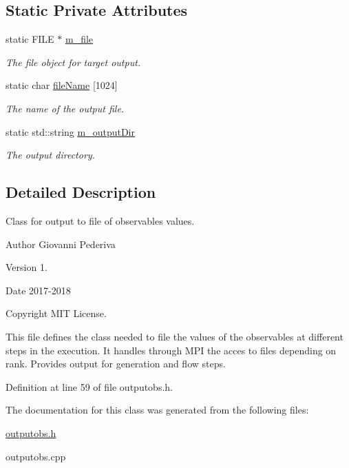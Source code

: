 \subsection*{Static Private Attributes}
\begin{DoxyCompactItemize}
\item 
static F\+I\+LE $\ast$ \hyperlink{classLatticeIO_1_1OutputObs_ad725efe02bfef0f70ef2a43722ce041d}{m\+\_\+file}\hypertarget{classLatticeIO_1_1OutputObs_ad725efe02bfef0f70ef2a43722ce041d}{}\label{classLatticeIO_1_1OutputObs_ad725efe02bfef0f70ef2a43722ce041d}

\begin{DoxyCompactList}\small\item\em The file object for target output. \end{DoxyCompactList}\item 
static char \hyperlink{classLatticeIO_1_1OutputObs_a451f0e835e3dfe2fc70cf779b73aae5d}{file\+Name} \mbox{[}1024\mbox{]}\hypertarget{classLatticeIO_1_1OutputObs_a451f0e835e3dfe2fc70cf779b73aae5d}{}\label{classLatticeIO_1_1OutputObs_a451f0e835e3dfe2fc70cf779b73aae5d}

\begin{DoxyCompactList}\small\item\em The name of the output file. \end{DoxyCompactList}\item 
static std\+::string \hyperlink{classLatticeIO_1_1OutputObs_a3ec9162c9ca9ddae173a1facbaa64a3a}{m\+\_\+output\+Dir}\hypertarget{classLatticeIO_1_1OutputObs_a3ec9162c9ca9ddae173a1facbaa64a3a}{}\label{classLatticeIO_1_1OutputObs_a3ec9162c9ca9ddae173a1facbaa64a3a}

\begin{DoxyCompactList}\small\item\em The output directory. \end{DoxyCompactList}\end{DoxyCompactItemize}


\subsection{Detailed Description}
Class for output to file of observables values. 

\begin{DoxyAuthor}{Author}
Giovanni Pederiva 
\end{DoxyAuthor}
\begin{DoxyVersion}{Version}
1. 
\end{DoxyVersion}
\begin{DoxyDate}{Date}
2017-\/2018 
\end{DoxyDate}
\begin{DoxyCopyright}{Copyright}
M\+IT License.
\end{DoxyCopyright}
This file defines the class needed to file the values of the observables at different steps in the execution. It handles through M\+PI the acces to files depending on rank. Provides output for generation and flow steps. 

Definition at line 59 of file outputobs.\+h.



The documentation for this class was generated from the following files\+:\begin{DoxyCompactItemize}
\item 
\hyperlink{outputobs_8h}{outputobs.\+h}\item 
outputobs.\+cpp\end{DoxyCompactItemize}
